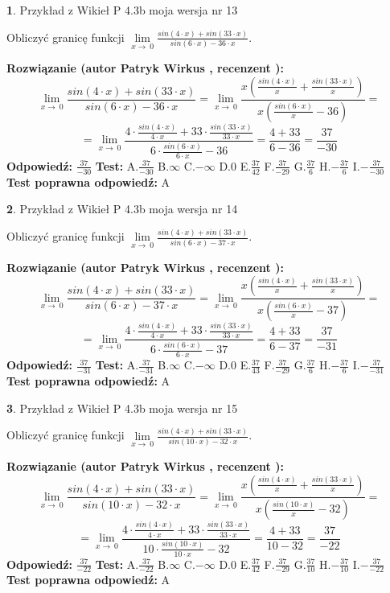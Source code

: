 \documentclass[12pt, a4paper]{article}
\theoremstyle{definition} %
\newtheorem{zad}{}
\newcommand{\zadStart}[1]{\begin{zad}#1\newline}
\newcommand{\zadStop}{\end{zad}}
\newcommand{\rozwStart}[2]{\noindent \textbf{Rozwiązanie (autor #1 , recenzent #2): }\newline}
\newcommand{\rozwStop}{\newline}
\newcommand{\odpStart}{\noindent \textbf{Odpowiedź:}\newline}
\newcommand{\odpStop}{\newline}
\newcommand{\testStart}{\noindent \textbf{Test:}\newline}
\newcommand{\testStop}{\newline}
\newcommand{\kluczStart}{\noindent \textbf{Test poprawna odpowiedź:}\newline}
\newcommand{\kluczStop}{\newline}
\begin{document}
\zadStart{Przykład z Wikieł P 4.3b moja wersja nr 13}


Obliczyć granicę funkcji $\lim\limits_{x\to\ 0}\frac{sin(4 \cdot x)+sin(33 \cdot x)}{sin(6 \cdot x)-36 \cdot x}$.
\zadStop
\rozwStart{Patryk Wirkus}{}
$$\lim\limits_{x\to\ 0}\frac{sin(4 \cdot x)+sin(33 \cdot x)}{sin(6 \cdot x)-36 \cdot x}=\lim\limits_{x\to\ 0}\frac{x(\frac{sin(4 \cdot x)}{x}+\frac{sin(33 \cdot x)}{x})}{x(\frac{sin(6 \cdot x)}{x}-36)}=$$
$$=\lim\limits_{x\to\ 0}\frac{4 \cdot \frac{sin(4 \cdot x)}{4 \cdot x}+33 \cdot \frac{sin(33 \cdot x)}{33 \cdot x}}{6 \cdot \frac{sin(6 \cdot x)}{6 \cdot x}-36}=\frac{4+33}{6-36} = \frac{37}{-30}$$
\rozwStop
\odpStart
$\frac{37}{-30}$
\odpStop
\testStart
A.$\frac{37}{-30}$
B.$\infty$
C.$-\infty$
D.$0$
E.$\frac{37}{42}$
F.$\frac{37}{-29}$
G.$\frac{37}{6}$
H.$-\frac{37}{6}$
I.$-\frac{37}{-30}$
\testStop
\kluczStart
A
\kluczStop



\zadStart{Przykład z Wikieł P 4.3b moja wersja nr 14}


Obliczyć granicę funkcji $\lim\limits_{x\to\ 0}\frac{sin(4 \cdot x)+sin(33 \cdot x)}{sin(6 \cdot x)-37 \cdot x}$.
\zadStop
\rozwStart{Patryk Wirkus}{}
$$\lim\limits_{x\to\ 0}\frac{sin(4 \cdot x)+sin(33 \cdot x)}{sin(6 \cdot x)-37 \cdot x}=\lim\limits_{x\to\ 0}\frac{x(\frac{sin(4 \cdot x)}{x}+\frac{sin(33 \cdot x)}{x})}{x(\frac{sin(6 \cdot x)}{x}-37)}=$$
$$=\lim\limits_{x\to\ 0}\frac{4 \cdot \frac{sin(4 \cdot x)}{4 \cdot x}+33 \cdot \frac{sin(33 \cdot x)}{33 \cdot x}}{6 \cdot \frac{sin(6 \cdot x)}{6 \cdot x}-37}=\frac{4+33}{6-37} = \frac{37}{-31}$$
\rozwStop
\odpStart
$\frac{37}{-31}$
\odpStop
\testStart
A.$\frac{37}{-31}$
B.$\infty$
C.$-\infty$
D.$0$
E.$\frac{37}{43}$
F.$\frac{37}{-29}$
G.$\frac{37}{6}$
H.$-\frac{37}{6}$
I.$-\frac{37}{-31}$
\testStop
\kluczStart
A
\kluczStop



\zadStart{Przykład z Wikieł P 4.3b moja wersja nr 15}


Obliczyć granicę funkcji $\lim\limits_{x\to\ 0}\frac{sin(4 \cdot x)+sin(33 \cdot x)}{sin(10 \cdot x)-32 \cdot x}$.
\zadStop
\rozwStart{Patryk Wirkus}{}
$$\lim\limits_{x\to\ 0}\frac{sin(4 \cdot x)+sin(33 \cdot x)}{sin(10 \cdot x)-32 \cdot x}=\lim\limits_{x\to\ 0}\frac{x(\frac{sin(4 \cdot x)}{x}+\frac{sin(33 \cdot x)}{x})}{x(\frac{sin(10 \cdot x)}{x}-32)}=$$
$$=\lim\limits_{x\to\ 0}\frac{4 \cdot \frac{sin(4 \cdot x)}{4 \cdot x}+33 \cdot \frac{sin(33 \cdot x)}{33 \cdot x}}{10 \cdot \frac{sin(10 \cdot x)}{10 \cdot x}-32}=\frac{4+33}{10-32} = \frac{37}{-22}$$
\rozwStop
\odpStart
$\frac{37}{-22}$
\odpStop
\testStart
A.$\frac{37}{-22}$
B.$\infty$
C.$-\infty$
D.$0$
E.$\frac{37}{42}$
F.$\frac{37}{-29}$
G.$\frac{37}{10}$
H.$-\frac{37}{10}$
I.$-\frac{37}{-22}$
\testStop
\kluczStart
A
\kluczStop
\end{document}
